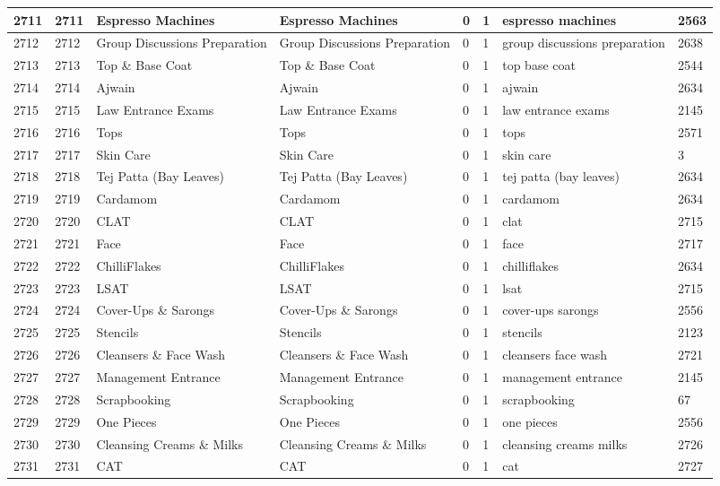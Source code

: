 \begin{longtable}{|l|l|l|l|l|l|l|l|}
2711 & 2711 & Espresso Machines & Espresso Machines & 0 & 1 & espresso machines & 2563 \\ \hline 
2712 & 2712 & Group Discussions Preparation & Group Discussions Preparation & 0 & 1 & group discussions preparation & 2638 \\ \hline 
2713 & 2713 & Top \& Base Coat & Top \& Base Coat & 0 & 1 & top base coat & 2544 \\ \hline 
2714 & 2714 & Ajwain & Ajwain & 0 & 1 & ajwain & 2634 \\ \hline 
2715 & 2715 & Law Entrance Exams & Law Entrance Exams & 0 & 1 & law entrance exams & 2145 \\ \hline 
2716 & 2716 & Tops & Tops & 0 & 1 & tops & 2571 \\ \hline 
2717 & 2717 & Skin Care & Skin Care & 0 & 1 & skin care & 3 \\ \hline 
2718 & 2718 & Tej Patta (Bay Leaves) & Tej Patta (Bay Leaves) & 0 & 1 & tej patta (bay leaves) & 2634 \\ \hline 
2719 & 2719 & Cardamom & Cardamom & 0 & 1 & cardamom & 2634 \\ \hline 
2720 & 2720 & CLAT & CLAT & 0 & 1 & clat & 2715 \\ \hline 
2721 & 2721 & Face & Face & 0 & 1 & face & 2717 \\ \hline 
2722 & 2722 & ChilliFlakes & ChilliFlakes & 0 & 1 & chilliflakes & 2634 \\ \hline 
2723 & 2723 & LSAT & LSAT & 0 & 1 & lsat & 2715 \\ \hline 
2724 & 2724 & Cover-Ups \& Sarongs & Cover-Ups \& Sarongs & 0 & 1 & cover-ups sarongs & 2556 \\ \hline 
2725 & 2725 & Stencils & Stencils & 0 & 1 & stencils & 2123 \\ \hline 
2726 & 2726 & Cleansers \& Face Wash & Cleansers \& Face Wash & 0 & 1 & cleansers face wash & 2721 \\ \hline 
2727 & 2727 & Management Entrance & Management Entrance & 0 & 1 & management entrance & 2145 \\ \hline 
2728 & 2728 & Scrapbooking & Scrapbooking & 0 & 1 & scrapbooking & 67 \\ \hline 
2729 & 2729 & One Pieces & One Pieces & 0 & 1 & one pieces & 2556 \\ \hline 
2730 & 2730 & Cleansing Creams \& Milks & Cleansing Creams \& Milks & 0 & 1 & cleansing creams milks & 2726 \\ \hline 
2731 & 2731 & CAT & CAT & 0 & 1 & cat & 2727 \\ \hline 

\end{longtable}

